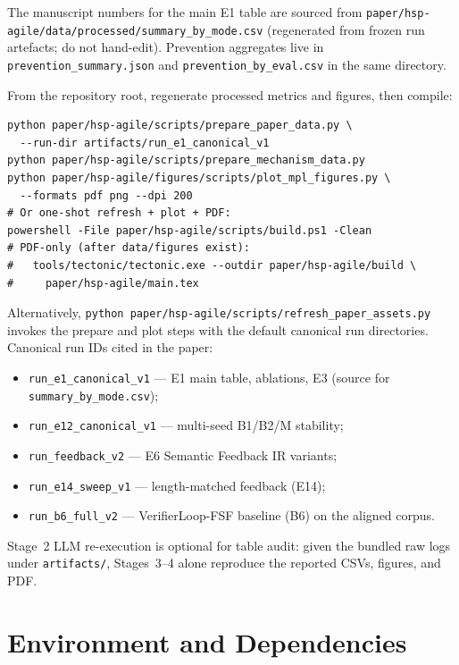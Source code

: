 The manuscript numbers for the main E1 table are sourced from
\texttt{paper/hsp-agile/data/processed/summary\_by\_mode.csv}
(regenerated from frozen run artefacts; do not hand-edit).
Prevention aggregates live in \texttt{prevention\_summary.json} and
\texttt{prevention\_by\_eval.csv} in the same directory.

From the repository root, regenerate processed metrics and figures, then
compile:

\begin{verbatim}
python paper/hsp-agile/scripts/prepare_paper_data.py \
  --run-dir artifacts/run_e1_canonical_v1
python paper/hsp-agile/scripts/prepare_mechanism_data.py
python paper/hsp-agile/figures/scripts/plot_mpl_figures.py \
  --formats pdf png --dpi 200
# Or one-shot refresh + plot + PDF:
powershell -File paper/hsp-agile/scripts/build.ps1 -Clean
# PDF-only (after data/figures exist):
#   tools/tectonic/tectonic.exe --outdir paper/hsp-agile/build \
#     paper/hsp-agile/main.tex
\end{verbatim}

Alternatively, \texttt{python paper/hsp-agile/scripts/refresh\_paper\_assets.py}
invokes the prepare and plot steps with the default canonical run directories.
Canonical run IDs cited in the paper:

\begin{itemize}
  \item \texttt{run\_e1\_canonical\_v1} --- E1 main table, ablations, E3
        (source for \texttt{summary\_by\_mode.csv});
  \item \texttt{run\_e12\_canonical\_v1} --- multi-seed B1/B2/M stability;
  \item \texttt{run\_feedback\_v2} --- E6 Semantic Feedback IR variants;
  \item \texttt{run\_e14\_sweep\_v1} --- length-matched feedback (E14);
  \item \texttt{run\_b6\_full\_v2} --- VerifierLoop-FSF baseline (B6) on the
        aligned corpus.
\end{itemize}

Stage~2 LLM re-execution is optional for table audit: given the bundled raw
logs under \texttt{artifacts/}, Stages~3--4 alone reproduce the reported CSVs,
figures, and PDF.

\section{Environment and Dependencies}
\label{sec:repro:env}

